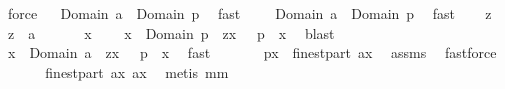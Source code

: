 \begin{isabellebody}
\ force\isanewline
{}\isamarkupfalse%
\ \isamarkupfalse%
\ {\isachardoublequoteopen}Domain\ a\ {\isasymsupseteq}\ Domain\ {\isacharquery}p{\isachardoublequoteclose}\ \isamarkupfalse%
\ fast\isanewline
{}\isamarkupfalse%
\ \isamarkupfalse%
\ \isanewline
{}{\isacharcolon}\ {\isachardoublequoteopen}Domain\ a\ {\isacharequal}\ Domain\ {\isacharquery}p{\isachardoublequoteclose}\ \isamarkupfalse%
\ fast\isanewline
\isacommand{{\isacharbraceleft}}\isamarkupfalse%
\isanewline
\ \ \isamarkupfalse%
\ z\ \isamarkupfalse%
\ {\isachardoublequoteopen}z\ {\isasymin}\ {\isacharquery}a{\isachardoublequoteclose}\ \isanewline
\ \ \isamarkupfalse%
\ \isamarkupfalse%
\ x\ \ \isanewline
\ \ {\isachardoublequoteopen}x\ {\isasymin}\ Domain\ {\isacharquery}p\ {\isacharampersand}\ z{\isacharequal}{\isacharparenleft}x\ {\isacharcomma}\ {\isasymUnion}\ {\isacharparenleft}{\isacharquery}p\ {\isacharbackquote}{\isacharbackquote}\ {\isacharbraceleft}x{\isacharbraceright}{\isacharparenright}{\isacharparenright}{\isachardoublequoteclose}\ \isamarkupfalse%
\ blast\isanewline
\ \ \isamarkupfalse%
\ \isamarkupfalse%
\ {\isachardoublequoteopen}x\ {\isasymin}\ Domain\ a\ {\isacharampersand}\ z{\isacharequal}{\isacharparenleft}x\ {\isacharcomma}\ {\isasymUnion}\ {\isacharparenleft}{\isacharquery}p\ {\isacharbackquote}{\isacharbackquote}\ {\isacharbraceleft}x{\isacharbraceright}{\isacharparenright}{\isacharparenright}{\isachardoublequoteclose}\ \isamarkupfalse%
\ fast\isanewline
\ \ \isamarkupfalse%
\ \isamarkupfalse%
\ \isamarkupfalse%
\ {\isachardoublequoteopen}{\isacharquery}p{\isacharbackquote}{\isacharbackquote}{\isacharbraceleft}x{\isacharbraceright}\ {\isacharequal}\ finestpart\ {\isacharparenleft}a{\isacharcomma}{\isacharcomma}x{\isacharparenright}{\isachardoublequoteclose}\ \isamarkupfalse%
\ assms\ \isamarkupfalse%
\ fastforce\isanewline
\ \ \isamarkupfalse%
\ \isamarkupfalse%
\ {\isachardoublequoteopen}{\isasymUnion}\ {\isacharparenleft}finestpart\ {\isacharparenleft}a{\isacharcomma}{\isacharcomma}x{\isacharparenright}{\isacharparenright}{\isacharequal}\ a{\isacharcomma}{\isacharcomma}x{\isachardoublequoteclose}\ \isamarkupfalse%
\ {\isacharparenleft}metis\ mm{}{}{\isacharparenright}\isanewline

\end{isabellebody}

